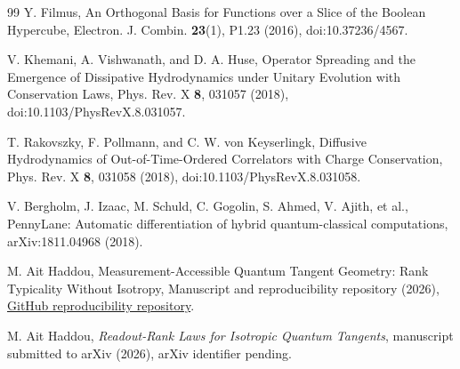 \documentclass[aps,prx,reprint,superscriptaddress,nofootinbib,longbibliography]{revtex4-2}
\begin{document}
\begin{thebibliography}{99}
Y. Filmus,
An Orthogonal Basis for Functions over a Slice of the Boolean Hypercube,
Electron. J. Combin. \textbf{23}(1), P1.23 (2016),
doi:10.37236/4567.

V. Khemani, A. Vishwanath, and D. A. Huse,
Operator Spreading and the Emergence of Dissipative Hydrodynamics under Unitary Evolution with Conservation Laws,
Phys. Rev. X \textbf{8}, 031057 (2018),
doi:10.1103/PhysRevX.8.031057.

T. Rakovszky, F. Pollmann, and C. W. von Keyserlingk,
Diffusive Hydrodynamics of Out-of-Time-Ordered Correlators with Charge Conservation,
Phys. Rev. X \textbf{8}, 031058 (2018),
doi:10.1103/PhysRevX.8.031058.



V. Bergholm, J. Izaac, M. Schuld, C. Gogolin, S. Ahmed, V. Ajith, et al.,
PennyLane: Automatic differentiation of hybrid quantum-classical computations,
arXiv:1811.04968 (2018).



M. Ait Haddou,
Measurement-Accessible Quantum Tangent Geometry: Rank Typicality Without Isotropy,
Manuscript and reproducibility repository (2026),
\href{https://github.com/AHDMarwan/Spectral-Geometry-of-Accessible-Quantum-Tangents-Beyond-Isotropic-Readout-Rank-Laws}{GitHub reproducibility repository}.



M. Ait Haddou,
\textit{Readout-Rank Laws for Isotropic Quantum Tangents},
manuscript submitted to arXiv (2026), arXiv identifier pending.

\end{thebibliography}

\end{document}
